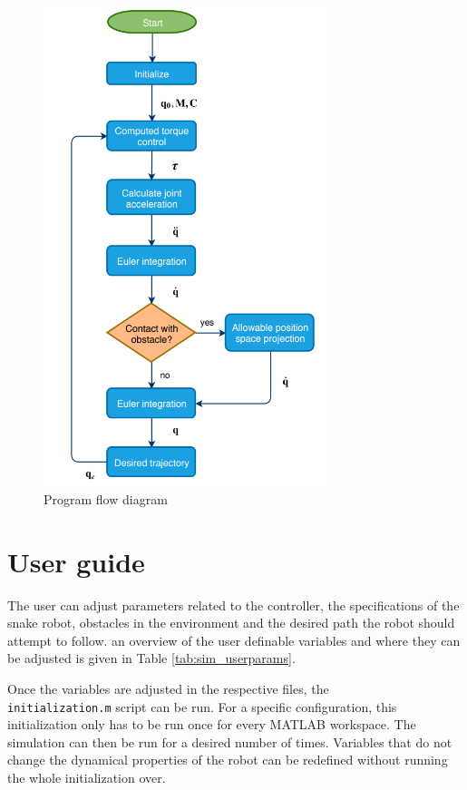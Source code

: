 \begin{figure}
    \centering
    \includegraphics[width=0.75\textwidth]{figures/sysflow.PNG}
    \caption{Program flow diagram}
    \label{fig:prog_flow}
\end{figure}


\section{User guide}

The user can adjust parameters related to the controller, the specifications of the snake robot, obstacles in the environment and the desired path the robot should attempt to follow. an overview of the user definable variables and where they can be adjusted is given in Table \ref{tab:sim_userparams}.

Once the variables are adjusted in the respective files, the \\ \texttt{initialization.m} script can be run. For a specific configuration, this initialization only has to be run once for every MATLAB workspace. The simulation can then be run for a desired number of times. Variables that do not change the dynamical properties of the robot can be redefined without running the whole initialization over.

